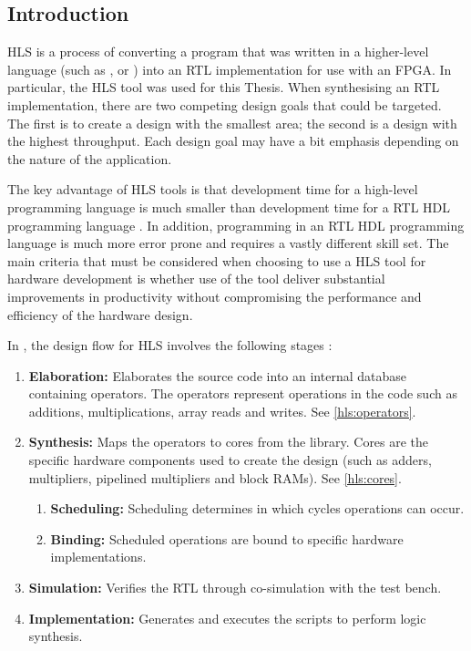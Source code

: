 \subsection{Introduction}
\label{hls:introduction}
\nocite{Xilinx:Tutorial}
\gls{HLS} is a process of converting a program that was written in a
higher-level language (such as ,  or
) into an \gls{RTL} implementation for use with an \gls{FPGA}.
In particular, the \gls{HLS} tool  was used for this Thesis.
When synthesising an \gls{RTL} implementation, there are two competing design
goals that could be targeted. The first is to create a design with the smallest
area; the second is a design with the highest throughput. Each design goal may
have a bit emphasis depending on the nature of the application.

The key advantage of \gls{HLS} tools is that development time for a high-level
programming language is much smaller than development time for a \gls{RTL}
\gls{HDL} programming language \cite{Berkeley:2010}. In addition, programming in
an \gls{RTL} \gls{HDL} programming language is much more error prone and
requires a vastly different skill set. The main criteria that must be considered
when choosing to use a \gls{HLS} tool for hardware development is whether use of
the tool deliver substantial improvements in productivity without compromising
the performance and efficiency of the hardware design.

In , the design flow for \gls{HLS} involves the following
stages \cite{Xilinx:Tutorial}:
\begin{enumerate}
    \item \textbf{Elaboration:} Elaborates the source code into an internal
        database containing operators. The operators represent operations in the
         code such as additions, multiplications, array reads and
        writes. See \autoref{hls:operators}.
    \item \textbf{Synthesis:} Maps the operators to cores from the
         library. Cores are the specific hardware components
        used to create the design (such as adders, multipliers, pipelined
        multipliers and block \glspl{RAM}). See \autoref{hls:cores}.
    \begin{enumerate}
        \item \textbf{Scheduling:} Scheduling determines in which cycles
            operations can occur.
        \item \textbf{Binding:} Scheduled operations are bound to specific
            hardware implementations.
    \end{enumerate}
    \item \textbf{Simulation:} Verifies the \gls{RTL} through co-simulation with
        the  test bench.
    \item \textbf{Implementation:} Generates and executes the scripts to perform
        logic synthesis.
\end{enumerate}

